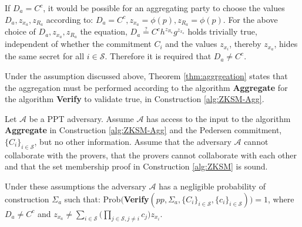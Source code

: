 If $D_a =  C^c$, it would be possible for an aggregating party to choose the values $D_a,z_{x_a},z_{R_a}$ according to: $D_a =C^c, z_{x_a} = \phi(p), z_{R_a} = \phi(p)$.
For the above choice of $D_a,z_{x_a},z_{R_a}$ the equation, $D_a\overset{?}{=} C^c h^{z_{R_a}}g^{z_{x_a}}$ holds trivially true, independent of whether the commitment $C_i$ and the values $z_{x_i}$, thereby $z_{x_a}$, hides the same secret for all $i\in\mathcal{S}$. Therefore it is required that $D_a \neq C^c$.


Under the assumption discussed above, Theorem \ref{thm:aggrgeation} states that the  aggregation must be performed according to the algorithm \textbf{Aggregate} for the algorithm \textbf{Verify} to validate true, in Construction \ref{alg:ZKSM-Agg}. 

\begin{thm}
\label{thm:aggrgeation}
Let $\mathcal{A}$ be a PPT adversary. Assume $\mathcal{A}$ has access to the input to the algorithm \textbf{Aggregate} in Construction \ref{alg:ZKSM-Agg} and the Pedersen commitment, $\{C_i\}_{i\in\mathcal{S}}$, but no other information. Assume that the adversary  $\mathcal{A}$ cannot collaborate with the provers, that the provers cannot collaborate with each other and that the set membership proof in Construction \ref{alg:ZKSM} is sound. 



Under these assumptions the adversary $\mathcal{A}$ has a negligible probability of construction $\Sigma_a$ such that: Prob$($\textbf{Verify}$(pp,\Sigma_a,\{C_i\}_{i\in\mathcal{S}},\{c_i\}_{i\in\mathcal{S}}) )=1$, where $D_a\neq C^c$ and  $z_{x_a} \neq \sum_{i\in\mathcal{S}} \Big( \prod_{j\in\mathcal{S}, j\neq i} c_j \big) z_{x_i}$. 


\end{thm}

